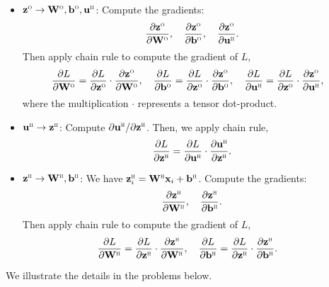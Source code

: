 \documentclass[11pt]{article}
\def\arr{\rightarrow}
\newcommand{\bbf}{\mathbf{b}}
\newcommand{\ubf}{\mathbf{u}}
\newcommand{\xbf}{\mathbf{x}}
\newcommand{\zbf}{\mathbf{z}}
\newcommand{\Wbf}{\mathbf{W}}
\def\hid{\textsc{\tiny H}}
\def\out{\textsc{\tiny O}}
\begin{document}
\begin{itemize}
\begin{itemize}
\item $\zbf^\out \arr \Wbf^\out, \bbf^\out, \ubf^\hid$: Compute the gradients:
\[
    \frac{\partial \zbf^\out}{\partial \Wbf^\out}, \quad
    \frac{\partial \zbf^\out}{\partial \bbf^\out}, \quad
    \frac{\partial \zbf^\out}{\partial \ubf^\hid}.
\]
Then apply chain rule to compute the gradient of $L$,
\begin{align*}
    \frac{\partial L}{\partial \Wbf^\out} &= \frac{\partial L}{\partial \zbf^\out} \cdot \frac{\partial \zbf^\out}{\partial \Wbf^\out}, \quad
    \frac{\partial L}{\partial \bbf^\out} = \frac{\partial L}{\partial \zbf^\out} \cdot \frac{\partial \zbf^\out}{\partial \bbf^\out}, \quad
    \frac{\partial L}{\partial \ubf^\hid} = \frac{\partial L}{\partial \zbf^\out} \cdot \frac{\partial \zbf^\out}{\partial \ubf^\hid},
\end{align*}
where the multiplication $\cdot$ represents a tensor dot-product.

\item $\ubf^\hid \arr \zbf^\hid$: Compute $\partial \ubf^\hid/\partial \zbf^\hid$. Then, we apply chain rule,
\[
    \frac{\partial L}{\partial \zbf^\hid} = \frac{\partial L}{\partial \ubf^\hid} \cdot \frac{\partial \ubf^\hid}{\partial \zbf^\hid}.
\]

\item $\zbf^\hid \arr \Wbf^\hid, \bbf^\hid$:
We have $\zbf^\hid_i = \Wbf^\hid \xbf_i+ \bbf^\hid$.  Compute the gradients:
\[
    \frac{\partial \zbf^\hid}{\partial \Wbf^\hid}, \quad
    \frac{\partial \zbf^\hid}{\partial \bbf^\hid}.
\]
Then apply chain rule to compute the gradient of $L$,
\begin{align*}
    \frac{\partial L}{\partial \Wbf^\hid} &= \frac{\partial L}{\partial \zbf^\hid} \cdot \frac{\partial \zbf^\hid}{\partial \Wbf^\hid}, \quad
    \frac{\partial L}{\partial \bbf^\hid} = \frac{\partial L}{\partial \zbf^\hid} \cdot \frac{\partial \zbf^\hid}{\partial \bbf^\hid}.
\end{align*}
\end{itemize}
We illustrate the details in the problems below.
\end{itemize}
\end{document}
